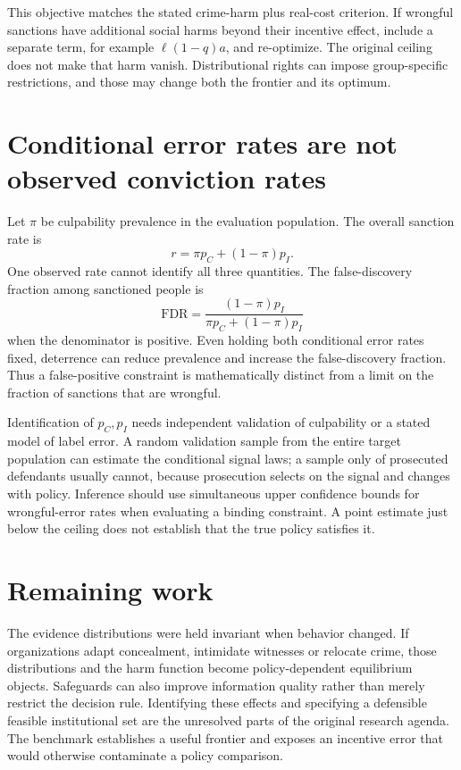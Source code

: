\documentclass[11pt]{article}
\begin{document}
This objective matches the stated crime-harm plus real-cost criterion. If wrongful sanctions have additional social harms beyond their incentive effect, include a separate term, for example $\ell(1-q)a$, and re-optimize. The original ceiling does not make that harm vanish. Distributional rights can impose group-specific restrictions, and those may change both the frontier and its optimum.

\section*{Conditional error rates are not observed conviction rates}
Let $\pi$ be culpability prevalence in the evaluation population. The overall sanction rate is
\[
                  r=\pi p_C+(1-\pi)p_I.
\]
One observed rate cannot identify all three quantities. The false-discovery fraction among sanctioned people is
\[
 \mathrm{FDR}=\frac{(1-\pi)p_I}{\pi p_C+(1-\pi)p_I}
\]
when the denominator is positive. Even holding both conditional error rates fixed, deterrence can reduce prevalence and increase the false-discovery fraction. Thus a false-positive constraint is mathematically distinct from a limit on the fraction of sanctions that are wrongful.

Identification of $p_C,p_I$ needs independent validation of culpability or a stated model of label error. A random validation sample from the entire target population can estimate the conditional signal laws; a sample only of prosecuted defendants usually cannot, because prosecution selects on the signal and changes with policy. Inference should use simultaneous upper confidence bounds for wrongful-error rates when evaluating a binding constraint. A point estimate just below the ceiling does not establish that the true policy satisfies it.

\section*{Remaining work}
The evidence distributions were held invariant when behavior changed. If organizations adapt concealment, intimidate witnesses or relocate crime, those distributions and the harm function become policy-dependent equilibrium objects. Safeguards can also improve information quality rather than merely restrict the decision rule. Identifying these effects and specifying a defensible feasible institutional set are the unresolved parts of the original research agenda. The benchmark establishes a useful frontier and exposes an incentive error that would otherwise contaminate a policy comparison.
\end{document}
